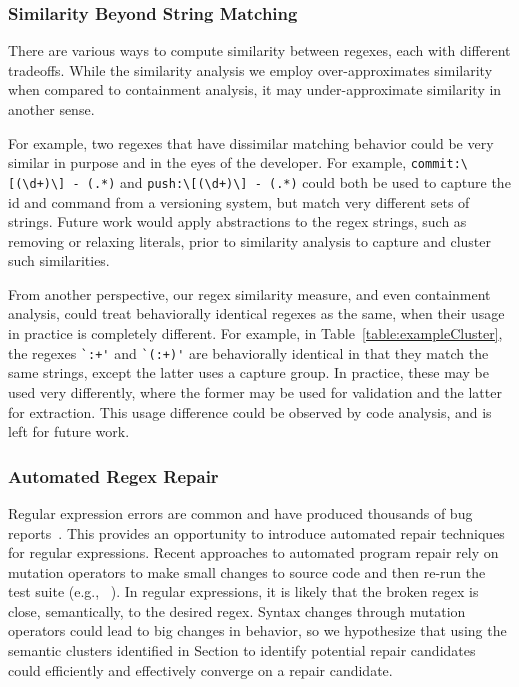 \vspace{-2pt}
\subsubsection{Similarity Beyond String Matching}
There are various ways to compute similarity between regexes, each with different tradeoffs.
While the similarity analysis we employ over-approximates similarity when compared to containment analysis, it may under-approximate similarity in another sense.

For example, two regexes that have dissimilar matching behavior could be very similar in purpose and in the eyes of the developer. For example, \verb!commit:\[(\d+)\] - (.*)! and \verb!push:\[(\d+)\] - (.*)! could both be used to  capture the id and command from a versioning system, but match very different sets of strings. Future work would apply abstractions to the regex strings, such as removing or relaxing literals, prior to similarity analysis to capture and cluster such similarities.

From another perspective, our regex similarity measure, and even containment analysis, could treat behaviorally identical regexes as the same, when  their usage in practice is completely different. For example, in Table~\ref{table:exampleCluster}, the regexes \verb!`:+'! and \verb!`(:+)'! are behaviorally identical in that they match the same strings, except the latter uses a capture group. In practice, these may be used very differently, where the former may be used for validation and the latter for extraction. This usage difference could be observed by code  analysis, and is left for future work.

\vspace{-2pt}
\subsubsection{Automated Regex Repair}
Regular expression errors are common and have produced thousands of bug reports~\cite{Spishak:2012:TSR:2318202.2318207}. This provides an opportunity to introduce automated repair techniques for regular expressions.
Recent approaches to automated program repair rely on mutation operators to make small changes to source code and then re-run the test suite (e.g., ~\cite{cacm10, genprog-tse-journal}). In regular expressions, it is likely that the broken regex is close, semantically, to the desired regex. Syntax changes through mutation operators could lead to big changes in behavior, so we hypothesize that using the semantic clusters identified in Section to identify potential repair candidates could efficiently and effectively converge on a repair candidate.

